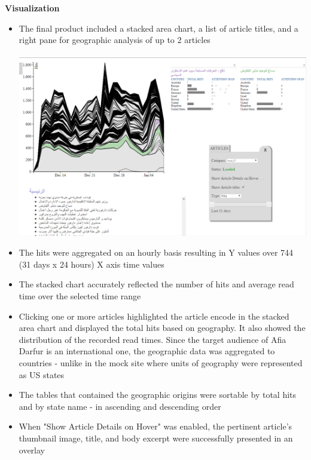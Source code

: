 \documentclass[12pt]{article}
\begin{document}
{\noindent\textbf{Visualization} 
\begin{itemize}
\item The final product included a stacked area chart, a list of article titles, and a right pane for geographic analysis of up to 2 articles
\\ \\
\noindent\includegraphics[scale=0.5]{img/afiadarfur_main_viz} \\
\item The hits were aggregated on an hourly basis resulting in Y values over 744 (31 days x 24 hours) X axis time values
\item The stacked chart accurately reflected the number of hits and average read time over the selected time range
\item Clicking one or more articles highlighted the article encode in the stacked area chart and displayed the total hits based on geography. It also showed the distribution of the recorded read times. Since the target audience of Afia Darfur is an international one, the geographic data was aggregated to countries - unlike in the mock site where units of geography were represented as US states
\item The tables that contained the geographic origins were sortable by total hits and by state name - in ascending and descending order
\item When "Show Article Details on Hover" was enabled, the pertinent article's thumbnail image, title, and body excerpt were successfully presented in an overlay \\ \\

\end{itemize}}
\end{document}
